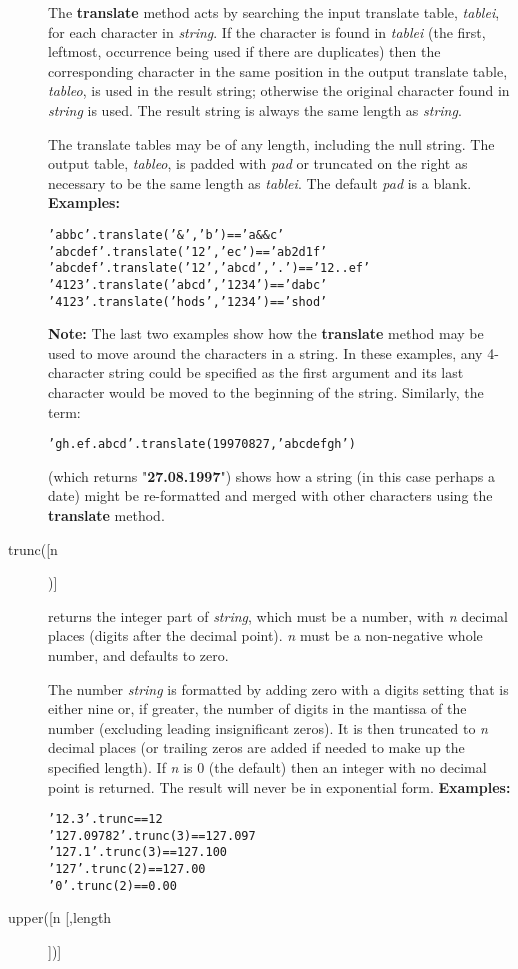 \begin{description}
The \textbf{translate} method acts by searching the input translate
table, \emph{tablei}, for each character in \emph{string}.
If the character is found in \emph{tablei} (the first, leftmost,
occurrence being used if there are duplicates) then the corresponding
character in the same position in the output translate table,
\emph{tableo}, is used in the result string; otherwise the original
character found in \emph{string} is used.
The result string is always the same length as \emph{string}.
 
The translate tables may be of any length, including the null string.
The output table, \emph{tableo}, is padded with \emph{pad} or
truncated on the right as necessary to be the same length as
\emph{tablei}.
The default \emph{pad} is a blank.
 \textbf{Examples:}
\begin{alltt}
'abbc'.translate('\&','b')           == 'a\&\&c'
'abcdef'.translate('12','ec')       == 'ab2d1f'
'abcdef'.translate('12','abcd','.') == '12..ef'
'4123'.translate('abcd','1234')     == 'dabc'
'4123'.translate('hods','1234')     == 'shod'
\end{alltt}
\textbf{Note: }The last two examples show how the \textbf{translate} method
may be used to move around the characters in a string.
In these examples, any 4-character string could be specified as the
first argument and its last character would be moved to the beginning of
the string.
Similarly, the term:
\begin{alltt}
'gh.ef.abcd'.translate(19970827,'abcdefgh')
\end{alltt}
(which returns "\textbf{27.08.1997}") shows how a string (in
this case perhaps a date) might be re-formatted and merged with other
characters using the \textbf{translate} method.
\item[trunc([n])]\label{reftrunc}

returns the integer part of \emph{string}, which must be a
number, with \emph{n} decimal places (digits after the decimal
point).
\emph{n} must be a non-negative whole number, and defaults to zero.
 
The number \emph{string} is formatted by adding zero with a digits
setting that is either nine or, if greater, the number of digits in the
mantissa of the number (excluding leading insignificant zeros).
It is then truncated to \emph{n} decimal places (or trailing zeros
are added if needed to make up the specified length).
If \emph{n} is 0 (the default) then an integer with no decimal
point is returned.
The result will never be in exponential form.
 \textbf{Examples:}
\begin{alltt}
'12.3'.trunc         == 12
'127.09782'.trunc(3) == 127.097
'127.1'.trunc(3)     == 127.100
'127'.trunc(2)       == 127.00
'0'.trunc(2)         == 0.00
\end{alltt}
\item[upper([n [,length]])]\label{refupper}


\end{description}
